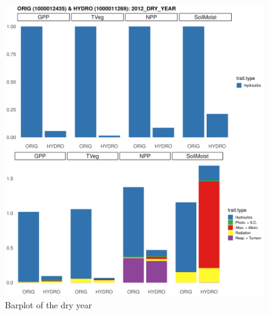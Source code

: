 
\begin{figure}[h]
    \centering
    \includegraphics[width=.3\textheight]{Hydro_Paper_LaTeX/Hydro_Paper_Figures/barplot_dry_year.png}
    \caption{Barplot of the dry year}
    \label{fig:barplot_dry}
\end{figure}

